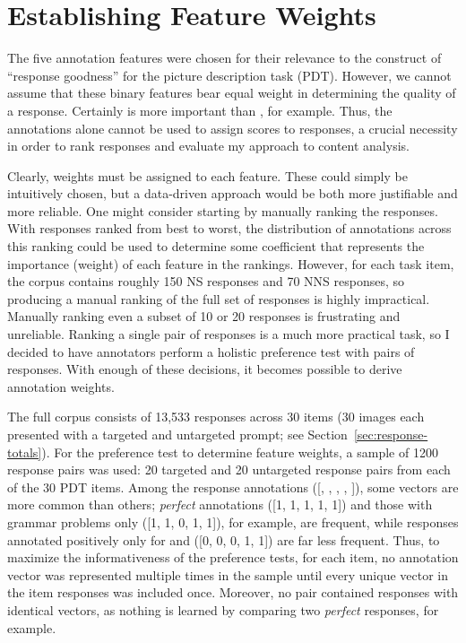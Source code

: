 \section{Establishing Feature Weights}
\label{sec:est-feat-weights}

The five annotation features were chosen for their relevance to the construct of ``response goodness'' for the picture description task (PDT). However, we cannot assume that these binary features bear equal weight in determining the quality of a response. Certainly  is more important than , for example. Thus, the annotations alone cannot be used to assign scores to responses, a crucial necessity in order to rank responses and evaluate my approach to content analysis.

Clearly, weights must be assigned to each feature. These could simply be intuitively chosen, but a data-driven approach would be both more justifiable and more reliable. One might consider starting by manually ranking the responses. With responses ranked from best to worst, the distribution of annotations across this ranking could be used to determine some coefficient that represents the importance (weight) of each feature in the rankings. However, for each task item, the corpus contains roughly 150 NS responses and 70 NNS responses, so producing a manual ranking of the full set of responses is highly impractical. Manually ranking even a subset of 10 or 20 responses is frustrating and unreliable. Ranking a single pair of responses is a much more practical task, so I decided to have annotators perform a holistic preference test with pairs of responses. With enough of these decisions, it becomes possible to derive annotation weights.

The full corpus consists of 13,533 responses across 30 items (30 images each presented with a targeted and untargeted prompt; see Section~\ref{sec:response-totals}). For the preference test to determine feature weights, a sample of 1200 response pairs was used: 20 targeted and 20 untargeted response pairs from each of the 30 PDT items. Among the response annotations  ([, , , , ]), some vectors are more common than others; \textit{perfect} annotations ([1, 1, 1, 1, 1]) and those with grammar problems only ([1, 1, 0, 1, 1]), for example, are frequent, while responses annotated positively only for  and  ([0, 0, 0, 1, 1]) are far less frequent. Thus, to maximize the informativeness of the preference tests, for each item, no annotation vector was represented multiple times in the sample until every unique vector in the item responses was included once. Moreover, no pair contained responses with identical vectors, as nothing is learned by comparing two \textit{perfect} responses, for example.


